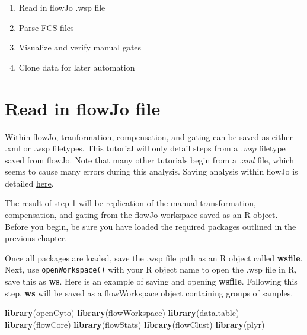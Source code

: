 \documentclass[]{book}
\newenvironment{Shaded}{\begin{snugshade}}{\end{snugshade}}
\newcommand{\KeywordTok}[1]{\textcolor[rgb]{0.13,0.29,0.53}{\textbf{#1}}}
\newcommand{\NormalTok}[1]{#1}
\providecommand{\tightlist}{%
  \setlength{\itemsep}{0pt}\setlength{\parskip}{0pt}}
\begin{document}
\begin{enumerate}
\def\labelenumi{\arabic{enumi}.}
\tightlist
\item
  Read in flowJo .wsp file\\
\item
  Parse FCS files\\
\item
  Visualize and verify manual gates
\item
  Clone data for later automation
\end{enumerate}

\hypertarget{read-in-flowjo-file}{%
\section{Read in flowJo file}\label{read-in-flowjo-file}}

Within flowJo, tranformation, compensation, and gating can be saved as either .xml or .wsp filetypes. This tutorial will only detail steps from a \emph{.wsp} filetype saved from flowJo. Note that many other tutorials begin from a \emph{.xml} file, which seems to cause many errors during this analysis. Saving analysis within flowJo is detailed \href{http://docs.flowjo.com/vx/workspaces-and-samples/ws-savinganalysis/}{here}.

The result of step 1 will be replication of the manual transformation, compensation, and gating from the flowJo workspace saved as an R object. Before you begin, be sure you have loaded the required packages outlined in the previous chapter.

Once all packages are loaded, save the .wsp file path as an R object called \textbf{wsfile}. Next, use \texttt{openWorkspace()} with your R object name to open the .wsp file in R, save this as \textbf{ws}. Here is an example of saving and opening \textbf{wsfile}. Following this step, \textbf{ws} will be saved as a flowWorkspace object containing groups of samples.

\begin{Shaded}
\begin{Highlighting}[]
\KeywordTok{library}\NormalTok{(openCyto)}
\KeywordTok{library}\NormalTok{(flowWorkspace)}
\KeywordTok{library}\NormalTok{(data.table)}
\KeywordTok{library}\NormalTok{(flowCore)}
\KeywordTok{library}\NormalTok{(flowStats)}
\KeywordTok{library}\NormalTok{(flowClust)}
\KeywordTok{library}\NormalTok{(plyr)}
\end{Highlighting}
\end{Shaded}
\end{document}
